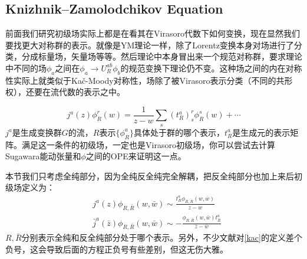 \subsection{Knizhnik\mbox{–}Zamolodchikov Equation}
前面我们研究初级场实际上都是在看其在Virasoro代数下如何变换，现在显然我们要找更大对称群的表示。就像是YM理论一样，除了Lorentz变换本身对场进行了分类，分成标量场，矢量场等等。然后理论中本身冒出来一个规范对称群，要求理论中不同的场$\phi_a$之间在$\phi_a\to U^{ab}_R\phi_b$的规范变换下理论仍不变。这种场之间的内在对称性实际上就类似于Ka\v{c}\mbox{-}Moody对称性，场除了被Virasoro表示分类（不同的共形权），还要在流代数的表示之中。
\begin{definition}
	\begin{equation}\label{kac}
		\boxed{
			j^a(z)\phi_R^r(w)=\frac1{z-w}\sum_s\left(t_R^a\right)_s^r\phi_R^s(w)+\cdots 
		}
	\end{equation}
	$j^a$是生成变换群$G$的流，$R$表示$\{\phi_R^a\}$具体处于群的哪个表示，$t^a_R$是生成元的表示矩阵。满足这一条件的初级场，一定也是Virasoro初级场，你可以尝试去计算Sugawara能动张量和$\phi$之间的OPE来证明这一点。
\end{definition}
\begin{remark}
	本节我们只考虑全纯部分，因为全纯反全纯完全解耦，把反全纯部分也加上来后初级场定义为：
	\begin{equation}
		\begin{aligned}&j^a(z)\phi_{R,\bar R}(w,\bar{w})\sim\frac{t_R^a\phi_{R,\bar R}(w,\bar{w})}{z-w}\\&\bar{j}^a(\bar{z})\phi_{R,\bar R}(w,\bar{w})\sim-\frac{\phi_{R,\bar R}(w,\bar{w})t_{{\bar R}}^a}{\bar{z}-\bar{w}}\end{aligned}
	\end{equation}
	$R,\bar R$分别表示全纯和反全纯部分处于哪个表示。另外，不少文献对\ref{kac}的定义差个负号，这会导致后面的方程正负号有些差别，但这无伤大雅。
\end{remark}
